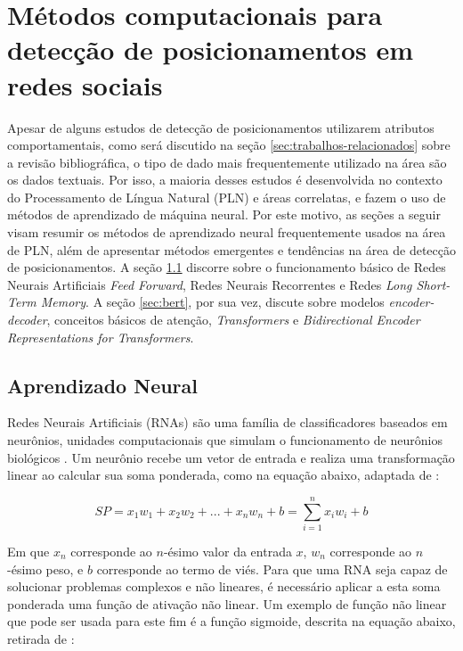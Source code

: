 \documentclass[
	12pt, oneside, a4paper, english, brazil
]{abntex2ppgsi}
\begin{document}
\section{Métodos computacionais para detecção de posicionamentos em redes sociais}
\label{sec:metodos}

Apesar de alguns estudos de detecção de posicionamentos utilizarem atributos comportamentais, como será discutido na seção \ref{sec:trabalhos-relacionados} sobre a revisão bibliográfica, o tipo de dado mais frequentemente utilizado na área são os dados textuais. Por isso, a maioria desses estudos é desenvolvida no contexto do Processamento de Língua Natural (PLN) e áreas correlatas, e fazem o uso de métodos de aprendizado de máquina neural. Por este motivo, as seções a seguir visam resumir os métodos de aprendizado neural frequentemente usados na área de PLN, além de apresentar métodos emergentes e tendências na área de detecção de posicionamentos. A seção \ref{sec:aprendizado-neural} discorre sobre o funcionamento básico de Redes Neurais Artificiais {\em Feed Forward}, Redes Neurais Recorrentes e Redes {\em Long Short-Term Memory}. A seção \ref{sec:bert}, por sua vez, discute sobre modelos {\em encoder-decoder}, conceitos básicos de atenção, {\em Transformers} e {\em Bidirectional Encoder Representations for Transformers}.

\subsection{Aprendizado Neural}
\label{sec:aprendizado-neural}

Redes Neurais Artificiais (RNAs) são uma família de classificadores baseados em neurônios, unidades computacionais que simulam o funcionamento de neurônios biológicos \cite{shalev2014}. Um neurônio recebe um vetor de entrada e realiza uma transformação linear ao calcular sua soma ponderada, como na equação abaixo, adaptada de :

\begin{equation}
    SP = x_1w_1 + x_2w_2 + ... + x_nw_n + b = \sum_{i=1}^{n} x_iw_i + b
\end{equation}

Em que $x_n$ corresponde ao $n$-ésimo valor da entrada $x$, $w_n$ corresponde ao $n$-ésimo peso, e $b$ corresponde ao termo de viés. Para que uma RNA seja capaz de solucionar problemas complexos e não lineares, é necessário aplicar a esta soma ponderada uma função de ativação não linear. Um exemplo de função não linear que pode ser usada para este fim é a função sigmoide, descrita na equação abaixo, retirada de :
\end{document}
